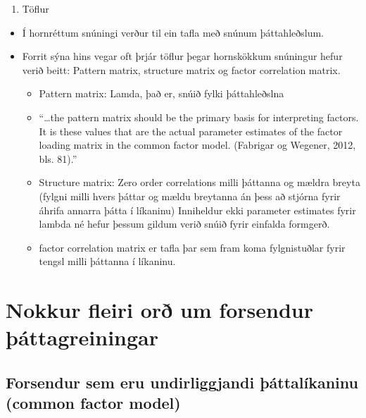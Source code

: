 \documentclass[]{book}
\providecommand{\tightlist}{%
  \setlength{\itemsep}{0pt}\setlength{\parskip}{0pt}}
\begin{document}
\begin{enumerate}
\def\labelenumi{\arabic{enumi})}
\setcounter{enumi}{1}
\tightlist
\item
  Töflur
\end{enumerate}

\begin{itemize}
\tightlist
\item
  Í hornréttum snúningi verður til ein tafla með snúnum þáttahleðslum.
\item
  Forrit sýna hins vegar oft þrjár töflur þegar hornskökkum snúningur hefur verið beitt: Pattern matrix, structure matrix og factor correlation matrix.

  \begin{itemize}
  \tightlist
  \item
    Pattern matrix: Lamda, það er, snúið fylki þáttahleðslna
  \item
    ``\ldots{}the pattern matrix should be the primary basis for interpreting factors. It is these values that are the actual parameter estimates of the factor loading matrix in the common factor model. (Fabrigar og Wegener, 2012, bls. 81).''
  \item
    Structure matrix: Zero order correlations milli þáttanna og mældra breyta (fylgni milli hvers þáttar og mældu breytanna án þess að stjórna fyrir áhrifa annarra þátta í líkaninu) Inniheldur ekki parameter estimates fyrir lambda né hefur þessum gildum verið snúið fyrir einfalda formgerð.
  \item
    factor correlation matrix er tafla þar sem fram koma fylgnistuðlar fyrir tengsl milli þáttanna í líkaninu.
  \end{itemize}
\end{itemize}

\hypertarget{nokkur-fleiri-oruxf0-um-forsendur-uxfeuxe1ttagreiningar}{%
\section{Nokkur fleiri orð um forsendur þáttagreiningar}\label{nokkur-fleiri-oruxf0-um-forsendur-uxfeuxe1ttagreiningar}}

\hypertarget{forsendur-sem-eru-undirliggjandi-uxfeuxe1ttaluxedkaninu-common-factor-model}{%
\subsection{Forsendur sem eru undirliggjandi þáttalíkaninu (common factor model)}\label{forsendur-sem-eru-undirliggjandi-uxfeuxe1ttaluxedkaninu-common-factor-model}}
\end{document}
